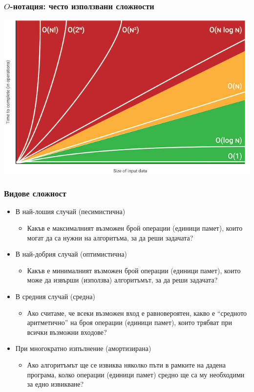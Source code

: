 \documentclass[alsotrans]{beamerswitch}
\begin{document}
\begin{frame}
  \frametitle{$O$-нотация: често използвани сложности}
  \begin{center}
    \includegraphics[height=0.7\textheight]{images/big-o.png}\\
  \end{center}
\end{frame}

\begin{frame}
  \frametitle{Видове сложност}

  \begin{itemize}[<+->]
  \item В най-лошия случай (песимистична)
    \begin{itemize}
    \item Какъв е максималният възможен брой операции (единици памет), които могат да са нужни на алгоритъма, за да реши задачата?
    \end{itemize}

  \item В най-добрия случай (оптимистична)
    \begin{itemize}
    \item Какъв е минималният възможен брой операции (единици памет), които може да извърши (използва) алгоритъмът, за да реши задачата?
    \end{itemize}

  \item В средния случай (средна)
    \begin{itemize}
    \item Ако считаме, че всеки възможен вход е равновероятен, какво е ``средното аритметично'' на броя операции (единици памет), които трябват при всички възможни входове?
    \end{itemize}

  \item При многократно изпълнение (амортизирана)
    \begin{itemize}
    \item Ако алгоритъмът ще се извиква няколко пъти в рамките на дадена програма, колко операции (единици памет) средно ще са му необходими за едно извикване?
    \end{itemize}
  \end{itemize}

\end{frame}
\end{document}
